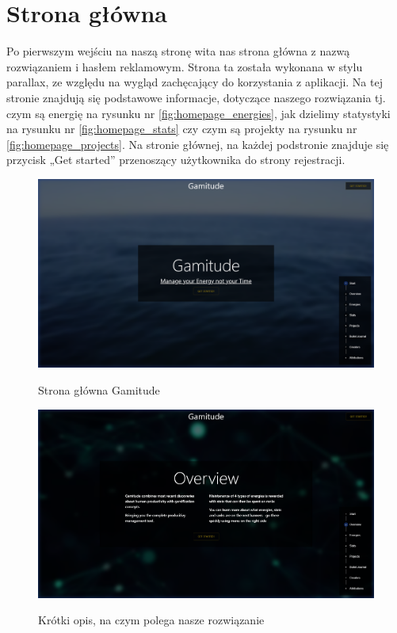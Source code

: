 \documentclass[a4paper,11pt]{report}
\begin{document}
\section{Strona główna}
Po pierwszym wejściu na naszą stronę wita nas strona główna z nazwą rozwiązaniem i hasłem reklamowym. 
Strona ta została wykonana w stylu parallax, ze względu na wygląd zachęcający do korzystania z aplikacji.
Na tej stronie znajdują się podstawowe informacje, dotyczące naszego rozwiązania tj. czym są energię na rysunku nr \ref{fig:homepage_energies}, jak dzielimy statystyki na rysunku nr \ref{fig:homepage_stats} czy czym są projekty na rysunku nr \ref{fig:homepage_projects}.
Na stronie głównej, na każdej podstronie znajduje się przycisk „Get started” przenoszący użytkownika do strony rejestracji.
\begin{figure}[H]
	\centering
	\includegraphics[scale=0.3]{prezentacja/Homepage}\\
	\caption{Strona główna Gamitude}
	\label{fig:homepage}
\end{figure}
\begin{figure}[H]
	\centering
	\includegraphics[scale=0.3]{prezentacja/Homepage_Overview}\\
	\caption{Krótki opis, na czym polega nasze rozwiązanie}
	\label{fig:homepage_overview}
\end{figure}
\end{document}
